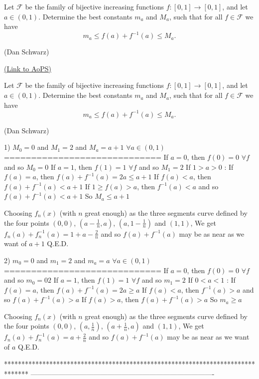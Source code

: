 \begin{problem}
	Let $\mathcal{F}$ be the family of bijective increasing functions $f: [0,1] \to [0,1]$, and let $a \in (0,1)$. Determine the best constants $m_a$ and $M_a$, such that for all $f \in \mathcal{F}$ we have
\[m_a \leq f(a) + f^{-1}(a) \leq M_a.\]

\begin{italicized}(Dan Schwarz)\end{italicized}
	\flushright \href{https://artofproblemsolving.com/community/c6h559021}{(Link to AoPS)}
\end{problem}



\begin{solution}
	\begin{tcolorbox}Let $\mathcal{F}$ be the family of bijective increasing functions $f: [0,1] \to [0,1]$, and let $a \in (0,1)$. Determine the best constants $m_a$ and $M_a$, such that for all $f \in \mathcal{F}$ we have
\[m_a \leq f(a) + f^{-1}(a) \leq M_a.\]

\begin{italicized}(Dan Schwarz)\end{italicized}\end{tcolorbox}

1) $M_0=0$ and $M_1=2$ and $M_a=a+1$ $\forall a\in(0,1)$
=============================
If $a=0$, then $f(0)=0$ $\forall f$ and so $M_0=0$
If $a=1$, then $f(1)=1$ $\forall f$ and so $M_1=2$
If $1>a>0$ :
If $f(a)=a$, then $f(a)+f^{-1}(a)=2a\le a+1$
If $f(a)<a$, then $f(a)+f^{-1}(a)<a+1$
If $1\ge f(a)>a$, then $f^{-1}(a)<a$ and so $f(a)+f^{-1}(a)<a+1$
So $M_a\le a+1$

Choosing $f_n(x)$ (with $n$ great enough) as the three segments curve defined by the four points $(0,0)$, $(a-\frac 1n,a)$, $(a,1-\frac 1n)$ and $(1,1)$,
We get $f_n(a)+f_n^{-1}(a)=1+a-\frac 2n$ and so $f(a)+f^{-1}(a)$ may be as near as we want of $a+1$
Q.E.D.

2) $m_0=0$ and $m_1=2$ and $m_a=a$ $\forall a\in(0,1)$
=============================
If $a=0$, then $f(0)=0$ $\forall f$ and so $m_0=02$
If $a=1$, then $f(1)=1$ $\forall f$ and so $m_1=2$
If $0<a<1$ :
If $f(a)=a$, then $f(a)+f^{-1}(a)=2a\ge a$
If $f(a)<a$, then $f^{-1}(a)>a$ and so $f(a)+f^{-1}(a)>a$
If $f(a)>a$, then $f(a)+f^{-1}(a)>a$
So $m_a\ge a$

Choosing $f_n(x)$ (with $n$ great enough) as the three segments curve defined by the four points $(0,0)$, $(a,\frac 1n)$, $(a+\frac 1n,a)$ and $(1,1)$,
We get $f_n(a)+f_n^{-1}(a)=a+\frac 2n$ and so $f(a)+f^{-1}(a)$ may be as near as we want of $a$
Q.E.D.
\end{solution}
*******************************************************************************
-------------------------------------------------------------------------------

